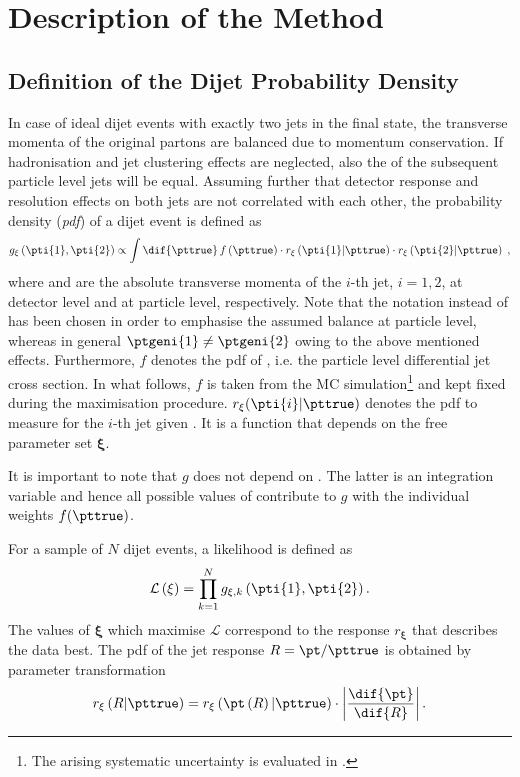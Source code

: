 

\section{Description of the Method}\label{sec:ResFit:Method}

\subsection{Definition of the Dijet Probability Density}
In case of ideal dijet events with exactly two jets in the final
state, the transverse momenta of the original partons are balanced due
to momentum conservation.
If hadronisation and jet clustering effects are neglected, also the
\ptgen of the subsequent particle level jets will be equal.
Assuming further that detector response and resolution effects on both jets are not correlated with each other, the probability density (\textit{pdf}) of a dijet event is defined as
\begin{equation}
  \label{eq:ResFit:DijetPdf}
  g_{\mathbf{\xi}}\left(\pti{1},\pti{2}\right) \propto \int\dif{\pttrue}\,f\left(\pttrue\right)
  \cdot r_{\mathbf{\xi}}\left(\pti{1}|\pttrue\right)
  \cdot r_{\mathbf{\xi}}\left(\pti{2}|\pttrue\right) \; ,
\end{equation}
where  and \pttrue are the absolute transverse momenta of the
$i$-th jet, \mbox{$i = 1,2$}, at detector level and at particle level, respectively.
Note that the notation \pttrue instead of \ptgen has been chosen in order to emphasise the assumed \pt
balance at particle level, whereas in general \mbox{$\ptgeni{1} \neq \ptgeni{2}$} owing to the above
mentioned effects.
Furthermore, $f$ denotes the pdf of \pttrue, i.e. the particle level differential jet 
cross section.
In what follows, $f$ is taken from the MC
simulation\footnote{The arising systematic uncertainty is evaluated in
  .}
and kept fixed during the maximisation procedure.
$r_{\mathbf{\xi}}(\pti{i}|\pttrue)$ denotes the pdf to measure  for the
$i$-th jet given \pttrue.
It is a function that depends on the free parameter set $\mathbf{\xi}$.

It is important to note that $g$ does not depend on \pttrue.
The latter is an integration variable and hence all possible values of \pttrue
contribute to $g$ with the individual weights $f(\pttrue)$.

For a sample of $N$ dijet events, a likelihood is defined as
\begin{equation}
  \label{eq:ResFit:Likelihood}
  \mathcal{L}\left(\mathbf{\xi}\right) = \prod^{N}_{k=1} g_{\mathbf{\xi},k}\left(\pti{1},\pti{2}\right).
\end{equation}
The values of $\mathbf{\xi}$ which maximise $\mathcal{L}$ correspond
to the response $r_{\mathbf{\xi}}$ that describes the data best.
The pdf of the jet \pt response \mbox{$R = \pt / \pttrue$} is obtained by parameter transformation
\begin{equation*}
  r_{\mathbf{\xi}}\left(R|\pttrue\right) =
  r_{\mathbf{\xi}}\left(\pt\left(R\right)|\pttrue\right)\cdot\left|\frac{\dif{\pt}}{\dif{R}}\right|.
\end{equation*}


